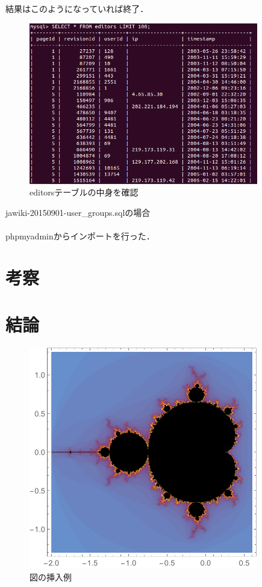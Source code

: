 結果はこのようになっていれば終了．

\begin{figure}[H]
\centering
\includegraphics[width=10cm]{editors_table_check.png}
\caption{editorsテーブルの中身を確認}\label{サンプル図}
\end{figure}

jawiki-20150901-user\_groups.sqlの場合\\
\\
phpmyadminからインポートを行った．











\chapter{考察}

\chapter{結論}

\begin{figure}[htb]
\centering
\includegraphics[width=10cm]{figure.pdf}
\caption{図の挿入例}\label{サンプル図}
\end{figure}

